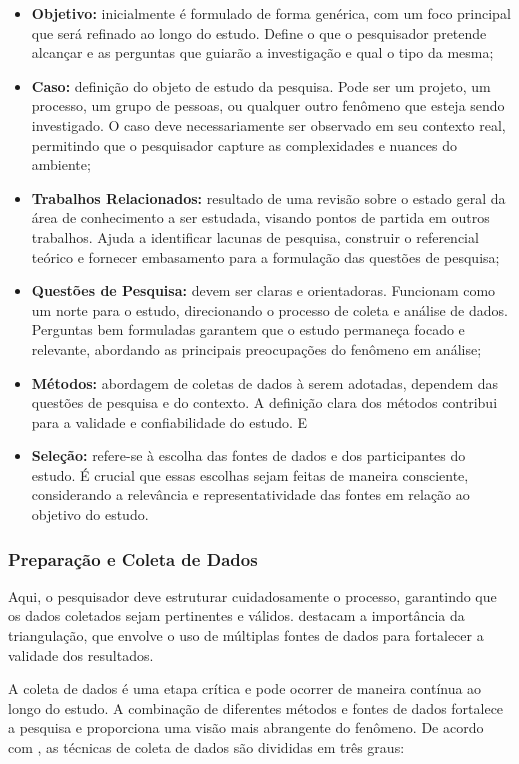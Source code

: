 \begin{itemize}
    \item \textbf{Objetivo:} inicialmente é formulado de forma genérica, com um foco principal que será refinado ao longo do estudo. Define o que o pesquisador pretende alcançar e as perguntas que guiarão a investigação e qual o tipo da mesma;
    \item \textbf{Caso:} definição do objeto de estudo da pesquisa. Pode ser um projeto, um processo, um grupo de pessoas, ou qualquer outro fenômeno que esteja sendo investigado. O caso deve necessariamente ser observado em seu contexto real, permitindo que o pesquisador capture as complexidades e nuances do ambiente;
    \item \textbf{Trabalhos Relacionados:} resultado de uma revisão sobre o estado geral da área de conhecimento a ser estudada, visando pontos de partida em outros trabalhos. Ajuda a identificar lacunas de pesquisa, construir o referencial teórico e fornecer embasamento para a formulação das questões de pesquisa;
    \item \textbf{Questões de Pesquisa:} devem ser claras e orientadoras. Funcionam como um norte para o estudo, direcionando o processo de coleta e análise de dados. Perguntas bem formuladas garantem que o estudo permaneça focado e relevante, abordando as principais preocupações do fenômeno em análise;
    \item \textbf{Métodos:} abordagem de coletas de dados à serem adotadas, dependem das questões de pesquisa e do contexto. A definição clara dos métodos contribui para a validade e confiabilidade do estudo. E
    \item \textbf{Seleção:} refere-se à escolha das fontes de dados e dos participantes do estudo. É crucial que essas escolhas sejam feitas de maneira consciente, considerando a relevância e representatividade das fontes em relação ao objetivo do estudo.
\end{itemize}

\subsubsection{Preparação e Coleta de Dados}
Aqui, o pesquisador deve estruturar cuidadosamente o processo, garantindo que os dados coletados sejam pertinentes e válidos.  destacam a importância da triangulação, que envolve o uso de múltiplas fontes de dados para fortalecer a validade dos resultados. 

A coleta de dados é uma etapa crítica e pode ocorrer de maneira contínua ao longo do estudo. A combinação de diferentes métodos e fontes de dados fortalece a pesquisa e proporciona uma visão mais abrangente do fenômeno. De acordo com ,  as técnicas de coleta de dados são divididas em três graus:

